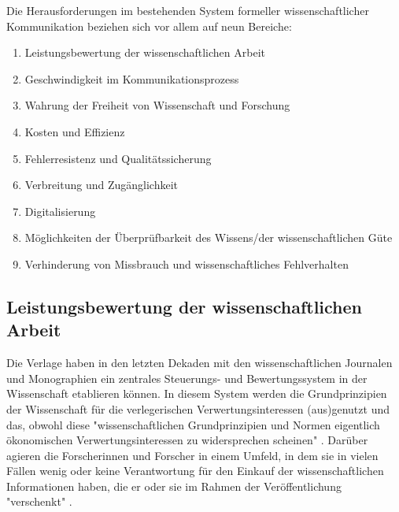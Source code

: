 Die Herausforderungen im bestehenden System formeller wissenschaftlicher Kommunikation beziehen sich vor allem auf neun Bereiche:
\begin{enumerate}
\item Leistungsbewertung der wissenschaftlichen Arbeit
\item Geschwindigkeit im Kommunikationsprozess
\item Wahrung der Freiheit von Wissenschaft und Forschung
\item Kosten und Effizienz
\item Fehlerresistenz und Qualitätssicherung
\item Verbreitung und Zugänglichkeit
\item Digitalisierung
\item Möglichkeiten der Überprüfbarkeit des Wissens/der wissenschaftlichen Güte
\item Verhinderung von Missbrauch und wissenschaftliches Fehlverhalten
\end{enumerate}

\subsection{Leistungsbewertung der wissenschaftlichen Arbeit}

Die Verlage haben in den letzten Dekaden mit den wissenschaftlichen Journalen und Monographien ein zentrales Steuerungs- und Bewertungssystem in der Wissenschaft etablieren können. In diesem System werden die Grundprinzipien der Wissenschaft für die verlegerischen Verwertungsinteressen (aus)genutzt und das, obwohl diese "wissenschaftlichen Grundprinzipien und Normen eigentlich ökonomischen Verwertungsinteressen zu widersprechen scheinen" \cite{hanekop_2006}. Darüber agieren die Forscherinnen und Forscher in einem Umfeld, in dem sie in vielen Fällen wenig oder keine Verantwortung für den Einkauf der wissenschaftlichen Informationen haben, die er oder sie im Rahmen der Veröffentlichung "verschenkt" \cite{steele_2006}.

